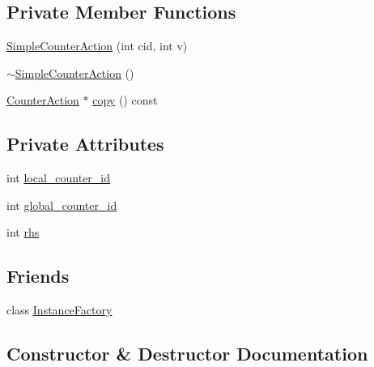 \subsection*{Private Member Functions}
\begin{DoxyCompactItemize}
\item 
\mbox{\hyperlink{classgraphsat_1_1_simple_counter_action_a3ee736027670066182093dd89fed7261}{Simple\+Counter\+Action}} (int cid, int v)
\item 
\mbox{\hyperlink{classgraphsat_1_1_simple_counter_action_a2d4814f53ecc39ea2ab5b6373997ee52}{$\sim$\+Simple\+Counter\+Action}} ()
\item 
\mbox{\hyperlink{classgraphsat_1_1_counter_action}{Counter\+Action}} $\ast$ \mbox{\hyperlink{classgraphsat_1_1_simple_counter_action_ad84a740a65e18a992f10a606d7f74973}{copy}} () const
\end{DoxyCompactItemize}
\subsection*{Private Attributes}
\begin{DoxyCompactItemize}
\item 
int \mbox{\hyperlink{classgraphsat_1_1_simple_counter_action_a2edaa883f547d60edf51d42bcbc58d84}{local\+\_\+counter\+\_\+id}}
\item 
int \mbox{\hyperlink{classgraphsat_1_1_simple_counter_action_a74278f307ef83054bdb1b71e06bac0b3}{global\+\_\+counter\+\_\+id}}
\item 
int \mbox{\hyperlink{classgraphsat_1_1_simple_counter_action_a0e80ccc511aef596440e3ee7a8f03beb}{rhs}}
\end{DoxyCompactItemize}
\subsection*{Friends}
\begin{DoxyCompactItemize}
\item 
class \mbox{\hyperlink{classgraphsat_1_1_simple_counter_action_ad4b3c25c041701ae56dc1e78df779d2f}{Instance\+Factory}}
\end{DoxyCompactItemize}


\subsection{Constructor \& Destructor Documentation}
\mbox{\label{classgraphsat_1_1_simple_counter_action_a3ee736027670066182093dd89fed7261}} 
